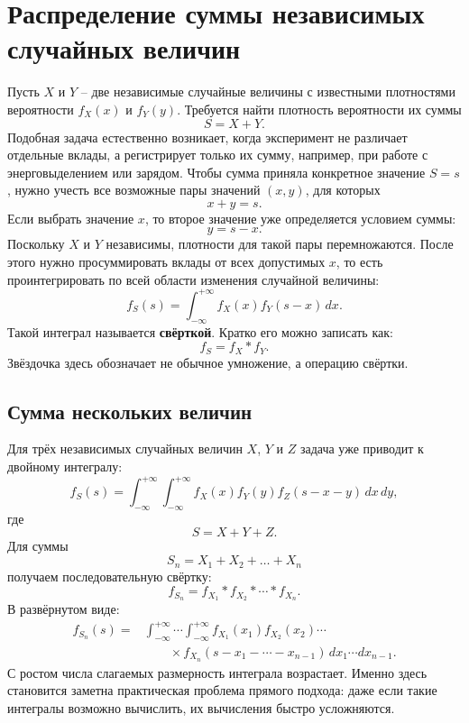 \documentclass[
  russian,
  12pt,
  a4paper,
  a4paper,
  openany]{scrbook}
\begin{document}
\section{Распределение суммы независимых случайных
величин}\label{ux440ux430ux441ux43fux440ux435ux434ux435ux43bux435ux43dux438ux435-ux441ux443ux43cux43cux44b-ux43dux435ux437ux430ux432ux438ux441ux438ux43cux44bux445-ux441ux43bux443ux447ux430ux439ux43dux44bux445-ux432ux435ux43bux438ux447ux438ux43d}

Пусть \(X\) и \(Y\) -- две независимые случайные величины с известными
плотностями вероятности \(f_X(x)\) и \(f_Y(y)\). Требуется найти
плотность вероятности их суммы \[S=X+Y.\] Подобная задача естественно
возникает, когда эксперимент не различает отдельные вклады, а
регистрирует только их сумму, например, при работе с энерговыделением
или зарядом. Чтобы сумма приняла конкретное значение \(S=s\), нужно
учесть все возможные пары значений \((x,y)\), для которых \[x+y=s.\]
Если выбрать значение \(x\), то второе значение уже определяется
условием суммы: \[y=s-x.\] Поскольку \(X\) и \(Y\) независимы, плотности
для такой пары перемножаются. После этого нужно просуммировать вклады от
всех допустимых \(x\), то есть проинтегрировать по всей области
изменения случайной величины: \[\boxed{
f_S(s)
=
\int_{-\infty}^{+\infty}
f_X(x)f_Y(s-x)\,dx.
}\] Такой интеграл называется \textbf{свёрткой}. Кратко его можно
записать как: \[f_S=f_X*f_Y.\] Звёздочка здесь обозначает не обычное
умножение, а операцию свёртки.

\subsection{Сумма нескольких
величин}\label{ux441ux443ux43cux43cux430-ux43dux435ux441ux43aux43eux43bux44cux43aux438ux445-ux432ux435ux43bux438ux447ux438ux43d}

Для трёх независимых случайных величин \(X\), \(Y\) и \(Z\) задача уже
приводит к двойному интегралу: \[f_S(s)
=
\int_{-\infty}^{+\infty}
\int_{-\infty}^{+\infty}
f_X(x)f_Y(y)f_Z(s-x-y)\,dx\,dy,\] где \[S=X+Y+Z.\] Для суммы
\[S_n=X_1+X_2+\dots+X_n\] получаем последовательную свёртку: \[\boxed{
f_{S_n}=f_{X_1}*f_{X_2}*\cdots*f_{X_n}.
}\] В развёрнутом виде: \[\begin{aligned}
f_{S_n}(s)
={}&
\int_{-\infty}^{+\infty}\cdots
\int_{-\infty}^{+\infty}
f_{X_1}(x_1)f_{X_2}(x_2)\cdots \\
&\qquad\times
f_{X_n}(s-x_1-\cdots-x_{n-1})
\,dx_1\cdots dx_{n-1}.
\end{aligned}\] С ростом числа слагаемых размерность интеграла
возрастает. Именно здесь становится заметна практическая проблема
прямого подхода: даже если такие интегралы возможно вычислить, их
вычисления быстро усложняются.
\end{document}
